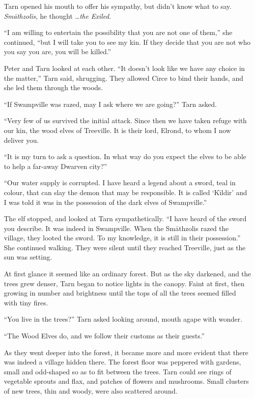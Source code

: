 Tarn opened his mouth to offer his sympathy, but didn't know what to say.  \emph{Sm\=athzolis}, he thought \ldots \emph{the Exiled}.

``I am willing to entertain the possibility that you are not one of them,'' she continued, ``but I will take you to see my kin.  If they decide that you are not who you say you are, you will be killed.''

Peter and Tarn looked at each other.  ``It doesn't look like we have any choice in the matter,'' Tarn said, shrugging.  They allowed Circe to bind their hands, and she led them through the woods.

``If Swampville was razed, may I ask where we are going?'' Tarn asked.

``Very few of us survived the initial attack.  Since then we have taken refuge with our kin, the wood elves of Treeville.  It is their lord, Elrond, to whom I now deliver you.

``It is my turn to ask a question.  In what way do you expect the elves to be able to help a far-away Dwarven city?''

``Our water supply is corrupted.  I have heard a legend about a sword, teal in colour, that can slay the demon that may be responsible.  It is called `K\=\i{}ldir' and I was told it was in the possession of the dark elves of Swampville.''

The elf stopped, and looked at Tarn sympathetically.  ``I have heard of the sword you describe.  It was indeed in Swampville.  When the Sm\=athzolis razed the village, they looted the sword.  To my knowledge, it is still in their possession.''  She continued walking.  They were silent until they reached Treeville, just as the sun was setting.

At first glance it seemed like an ordinary forest.  But as the sky darkened, and the trees grew denser, Tarn began to notice lights in the canopy.  Faint at first, then growing in number and brightness until the tops of all the trees seemed filled with tiny fires.

``You live in the trees?'' Tarn asked looking around, mouth agape with wonder.

``The Wood Elves do, and we follow their customs as their guests.''

As they went deeper into the forest, it became more and more evident that there was indeed a village hidden there.  The forest floor was peppered with gardens, small and odd-shaped so as to fit between the trees.  Tarn could see rings of vegetable sprouts and flax, and patches of flowers and mushrooms.  Small clusters of new trees, thin and woody, were also scattered around.

